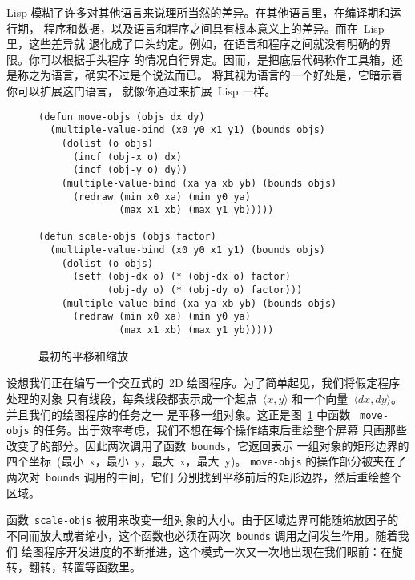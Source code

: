Lisp 模糊了许多对其他语言来说理所当然的差异。在其他语言里，在编译期和运行期，
程序和数据，以及语言和程序之间具有根本意义上的差异。而在~Lisp 里，这些差异就
退化成了口头约定。例如，在语言和程序之间就没有明确的界限。你可以根据手头程序
的情况自行界定。因而，是把底层代码称作工具箱，还是称之为语言，确实不过是个说法而已。
将其视为语言的一个好处是，它暗示着你可以扩展这门语言，
就像你通过\utility{}来扩展~Lisp 一样。

\begin{figure}
\begin{lstlisting}
(defun move-objs (objs dx dy)
  (multiple-value-bind (x0 y0 x1 y1) (bounds objs)
    (dolist (o objs)
      (incf (obj-x o) dx)
      (incf (obj-y o) dy))
    (multiple-value-bind (xa ya xb yb) (bounds objs)
      (redraw (min x0 xa) (min y0 ya)
              (max x1 xb) (max y1 yb)))))

(defun scale-objs (objs factor)
  (multiple-value-bind (x0 y0 x1 y1) (bounds objs)
    (dolist (o objs)
      (setf (obj-dx o) (* (obj-dx o) factor)
            (obj-dy o) (* (obj-dy o) factor)))
    (multiple-value-bind (xa ya xb yb) (bounds objs)
      (redraw (min x0 xa) (min y0 ya)
              (max x1 xb) (max y1 yb)))))
\end{lstlisting}
\caption{\label{fig:original_move_and_scale}最初的平移和缩放}
\end{figure}

设想我们正在编写一个交互式的~2D 绘图程序。为了简单起见，我们将假定程序处理的对象
只有线段，每条线段都表示成一个起点~$\langle x,y \rangle$ 和一个向量~$\langle dx,dy \rangle$。
并且我们的绘图程序的任务之一
是平移一组对象。这正是图~\ref{fig:original_move_and_scale} 中函数
~\texttt{move-objs} 的任务。出于效率考虑，我们不想在每个操作结束后重绘整个屏幕
\pozhehao{}只画那些改变了的部分。因此两次调用了函数~\texttt{bounds}，它返回表示
一组对象的矩形边界的四个坐标~(最小~x，最小~y，最大~x，最大~y)。
\texttt{move-objs} 的操作部分被夹在了两次对~\texttt{bounds} 调用的中间，它们
分别找到平移前后的矩形边界，然后重绘整个区域。

函数~\texttt{scale-objs} 被用来改变一组对象的大小。由于区域边界可能随缩放因子的
不同而放大或者缩小，这个函数也必须在两次~\texttt{bounds} 调用之间发生作用。随着我们
绘图程序开发进度的不断推进，这个模式一次又一次地出现在我们眼前：在旋转，翻转，转置等函数里。

